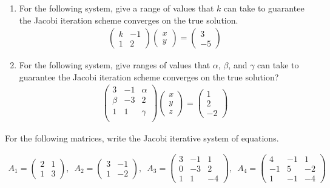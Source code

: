 {
\begin{enumerate}[label=\alph*)]
	\item For the following system, give a range of values that $k$ can take to guarantee the Jacobi iteration scheme converges on the true solution.
	\begin{align*}
	\begin{pmatrix}
	k & -1 \\
	1 & 2
	\end{pmatrix}
	\begin{pmatrix}
	x \\
	y
	\end{pmatrix}
	=
	\begin{pmatrix}
	3 \\
	-5
	\end{pmatrix}
	\end{align*}
	
	\item For the following system, give ranges of values that $\alpha$, $\beta$, and $\gamma$ can take to guarantee the Jacobi iteration scheme converges on the true solution?
	\begin{align*}
	\begin{pmatrix}
	3 & -1 & \alpha \\
	\beta & -3 & 2 \\
	1 & 1 & \gamma \\
	\end{pmatrix}
	\begin{pmatrix}
	x \\
	y \\
	z
	\end{pmatrix}
	=
	\begin{pmatrix}
	1 \\
	2 \\
	-2
	\end{pmatrix}
	\end{align*}
\end{enumerate}






For the following matrices, write the Jacobi iterative system of equations.

\begin{align*}
	A_1 = 
	\begin{pmatrix}
	2 & 1 \\
	1 & 3
	\end{pmatrix}, \,\,\,
	A_2 = 
	\begin{pmatrix}
	3 & -1 \\
	1 & -2
	\end{pmatrix}, \,\,\,
	A_3 = 
	\begin{pmatrix}
	3 & -1 &  1 \\
	0 & -3 &  2 \\
	1 &  1 & -4
	\end{pmatrix}, \,\,\,
	A_4 = 
	\begin{pmatrix}
	 4 & -1 &  1 \\
	-1 &  5 & -2 \\
	 1 & -1 & -4
	\end{pmatrix}
\end{align*}




}
